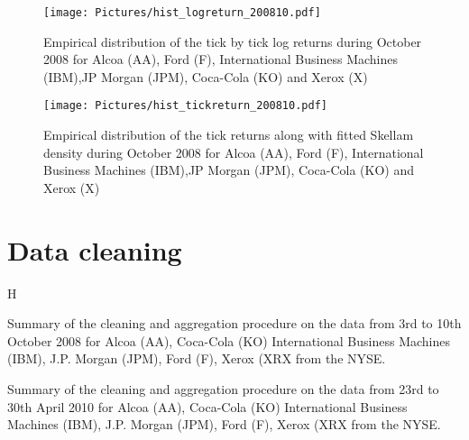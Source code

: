 \documentclass[12pt]{article}
\begin{document}
\begin{figure}[H]
  \centering 
\texttt{[image: Pictures/hist\_logreturn\_200810.pdf]}
       \caption{ Empirical distribution of the tick by tick log returns during October 2008 for Alcoa (AA), Ford (F), International Business Machines (IBM),JP Morgan (JPM), Coca-Cola (KO) and Xerox (X) }
 \label{c_pic:logreturn_pic}
 \end{figure} 

\begin{figure}[H]
  \centering 
\texttt{[image: Pictures/hist\_tickreturn\_200810.pdf]}
       \caption{ Empirical distribution of the tick returns along with fitted Skellam density during October 2008 for Alcoa (AA), Ford (F), International Business Machines (IBM),JP Morgan (JPM), Coca-Cola (KO) and Xerox (X) }
 \label{c_pic:tickreturn_pic}
 \end{figure}  
 
\section*{Data cleaning}
\label{c_sec:dataclean}
\begin{sidewaystable}{H}
\begin{scriptsize}
\begin{center}
\caption{Summary of the cleaning and aggregation procedure on the data from 3rd to 10th October 2008 for  Alcoa (AA), Coca-Cola (KO) International Business Machines (IBM), J.P. Morgan (JPM), Ford (F), Xerox (XRX from the NYSE.}
 
\label{c_table:data2008}
\end{center}
\begin{center}
\caption{Summary of the cleaning and aggregation procedure on the data from  23rd to 30th April 2010 for  Alcoa (AA), Coca-Cola (KO) International Business Machines (IBM), J.P. Morgan (JPM), Ford (F), Xerox (XRX from the NYSE.}

\label{c_table:data2010}
\end{center}
\end{scriptsize}
\end{sidewaystable} 
 



 
 
\end{document}

